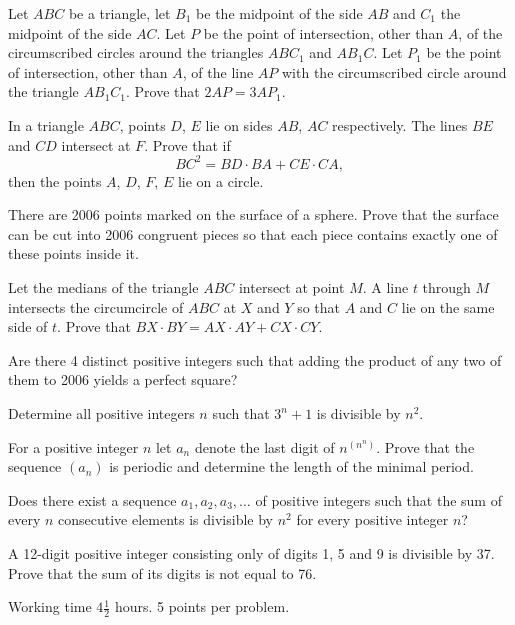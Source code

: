 \documentclass{bw06}
\begin{document}
\begin{problems}
\item  Let $ABC$ be a triangle, let $B_1$ be the midpoint of the side $AB$ and 
$C_1$ the midpoint of the side $AC$. Let $P$ be the point of intersection, other than
$A$, of the circumscribed circles around the triangles $ABC_1$ and $AB_1C$. Let 
$P_1$ be the point of intersection, other than $A$, of the line $AP$ with the 
circumscribed circle around the triangle $AB_1C_1$. Prove that $2AP = 3AP_1$.

\item  %
In a triangle $ABC$, points $D$, $E$ lie on sides $AB$, $AC$ respectively.
The lines $BE$ and $CD$ intersect at $F$. Prove that if
\[BC^2=BD\cdot BA+CE\cdot CA,\]
then the points $A$, $D$, $F$, $E$ lie on a circle.

\item  There are 2006 points marked on the surface of a sphere. Prove
  that the surface can be cut into 2006 congruent  pieces so that
  each piece contains exactly one of these points inside it.

\item  Let the medians of the triangle $ABC$ intersect at point $M$. A  
line $t$ through $M$ intersects the circumcircle of $ABC$ at $X$ and $Y$ so  
that $A$ and $C$ lie on the same side of $t$. Prove that $BX\cdot  
BY=AX\cdot AY + CX\cdot CY$.

\item Are there 4 distinct positive integers such that
adding the product of
any two of them to 2006 yields a perfect square?

\item  %
Determine all positive integers $n$ such that $3^n+1$ is divisible by $n^2$.

\item For a positive integer $n$ let $a_n$ denote the last digit of
$n^{(n^n)}$. Prove that the sequence $(a_n)$ is periodic and
determine the length of the minimal period.

\item Does there exist a sequence $a_1,a_2,a_3,\ldots$ of positive integers such that
the sum of every $n$ consecutive elements is divisible by $n^2$ for every
positive integer $n$?

\item  A 12-digit positive integer consisting only of digits
  1, 5 and 9 is divisible by 37.
  Prove that the sum of its digits is not equal to 76.


\end{problems}

Working time $4\frac{1}{2}$ hours. 5 points per problem.
\end{document}
